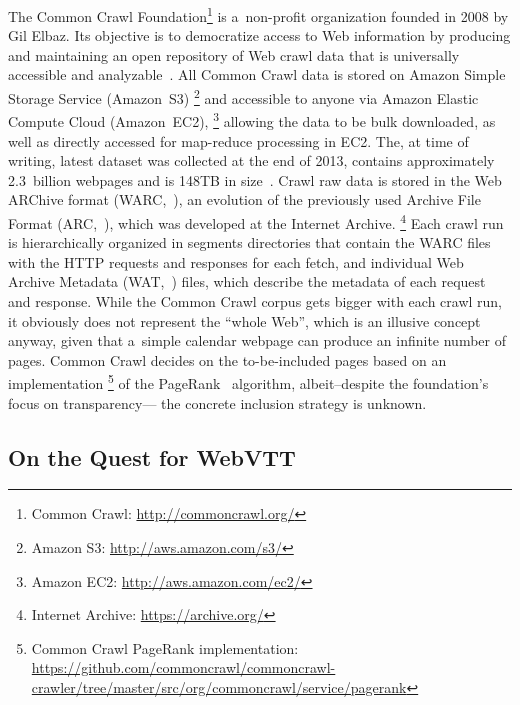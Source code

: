 \documentclass{sig-alternate}
\newcommand{\inlinelistingsize}{\fontsize{8pt}{11pt}}
\let\oldurl\url
\renewcommand{\url}[1]{\inlinelistingsize\oldurl{#1}}
\begin{document}
The Common Crawl Foundation\footnote{Common Crawl: \url{http://commoncrawl.org/}}
is a~non-profit organization founded in 2008 by Gil Elbaz.
Its objective is to democratize access to Web information
by producing and maintaining an open repository of Web crawl data
that is universally accessible and analyzable~\cite{simonite2013commoncrawl}.
All Common Crawl data is stored on Amazon Simple Storage Service (Amazon~S3)%
\footnote{Amazon S3: \url{http://aws.amazon.com/s3/}} and
accessible to anyone via Amazon Elastic Compute Cloud (Amazon~EC2),%
\footnote{Amazon EC2: \url{http://aws.amazon.com/ec2/}}
allowing the data to be bulk downloaded,
as well as directly accessed for map-reduce processing in EC2.
The, at time of writing, latest dataset was collected at the end of 2013,
contains approximately 2.3~billion webpages and is 148TB in size~\cite{green2014winter}.
Crawl raw data is stored in the Web ARChive format
(WARC,~\cite{iso285002008warc}), an evolution of the previously used
Archive File Format (ARC,~\cite{burner1996arc}),
which was developed at the Internet Archive.%
\footnote{Internet Archive: \url{https://archive.org/}}
Each crawl run is hierarchically organized in segments directories
that contain the WARC files with the HTTP requests and responses for each fetch,
and individual Web Archive Metadata (WAT,~\cite{goel2011wat}) files,
which describe the metadata of each request and response.
While the Common Crawl corpus gets bigger with each crawl run,
it obviously does not represent the ``whole Web'',
which is an illusive concept anyway,
given that a~simple calendar webpage can produce an infinite number of pages.
Common Crawl decides on the to-be-included pages based on an implementation%
\footnote{Common Crawl PageRank implementation:
\url{https://github.com/commoncrawl/commoncrawl-crawler/tree/master/src/org/commoncrawl/service/pagerank}}
of the PageRank~\cite{page1999pagerank} algorithm,
albeit--despite the foundation's focus on transparency---%
the concrete inclusion strategy is unknown.

\subsection{On the Quest for WebVTT}
\end{document}
